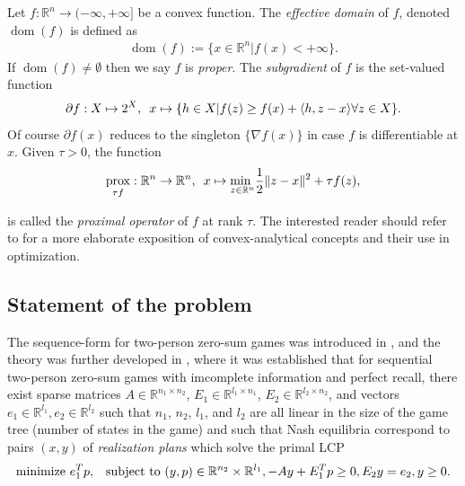 \documentclass[envcountsame]{llcns2e/llncs}
\DeclareMathOperator{\dom}{dom}
\DeclareMathOperator{\prox}{prox}
\begin{document}
Let $f : \mathbb{R}^n \rightarrow (-\infty, +\infty]$ be a convex
  function.
The \textit{effective domain} of $f$, denoted $\dom(f)$ is defined as
\begin{eqnarray}
  \dom(f) := \{x \in \mathbb{R}^n | f(x) < +\infty\}.
\end{eqnarray}
 If $\dom(f) \ne \emptyset$ then we say $f$ is \textit{proper}.
The \textit{subgradient} of $f$ is the set-valued function
\begin{eqnarray}
\partial f: X \mapsto 2^X, \hspace{.5em} x \mapsto \{h\in X |
f(z)  \ge f(x) + \langle h, z - x\rangle \forall z \in X\}.
\end{eqnarray}
Of course $\partial f(x)$ reduces to the singleton $\{\nabla f(x)\}$
in case $f$ is differentiable at $x$. Given $\tau > 0$, the function
\begin{eqnarray}
  \prox_{\tau f}: \mathbb{R}^n \rightarrow \mathbb{R}^n,\hspace{.5em}x
  \mapsto \underset{z \in \mathbb{R}^n}{\text{min }}\frac{1}{2}\|z
  - x\|^2 + \tau f(z),
\end{eqnarray}

is called the \textit{proximal operator} of $f$ at rank $\tau$.
The interested reader should refer to
\cite{rockafellar1997convex,combettes2011proximal} for a more
elaborate exposition of convex-analytical concepts and their use in
optimization.

\subsection{Statement of the problem}
The sequence-form for two-person zero-sum games was introduced in
\cite{koller1992complexity}, and the theory was further developed in
\cite{koller1994fast,von1996efficient,vonequilibrium}, where it was
established that for sequential two-person zero-sum games with
imcomplete information and perfect recall, there exist sparse matrices
$A \in \mathbb{R}^{n_1
  \times n_2}$, $E_1 \in \mathbb{R}^{l_1 \times n_1}$, $E_2 \in
\mathbb{R}^{l_2 \times n_2}$, and vectors $e_1 \in \mathbb{R}^{l_1},
e_2 \in \mathbb{R}^{l_2}$ such that $n_1$, $n_2$, $l_1$, and $l_2$ are
all linear in the size of the game tree (number of states in the game)
and such that Nash equilibria correspond to pairs $(x, y)$ of
\textit{realization plans} which solve the primal LCP
\begin{equation}
  \begin{aligned}
     \text{minimize }e_1^Tp, \hspace{.5em}\text{ subject to }(y,p) \in
     \mathbb{R}^{n_2} \times \mathbb{R}^{l_1}, -Ay +
    E_1^Tp \geq 0, E_2y = e_2, y \ge 0.
  \end{aligned}
  \label{eq:primal_pb}
\end{equation}
\end{document}

